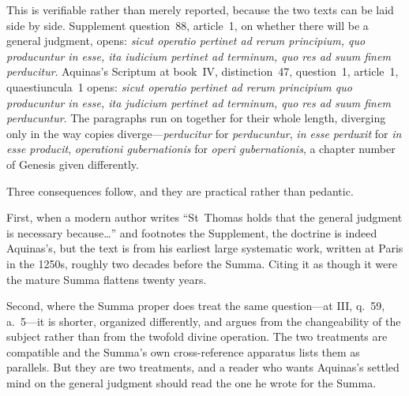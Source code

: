 This is verifiable rather than merely reported, because the two texts can be laid side by side. Supplement question~88, article~1, on whether there will be a general judgment, opens: \emph{sicut operatio pertinet ad rerum principium, quo producuntur in esse, ita iudicium pertinet ad terminum, quo res ad suum finem perducitur}. Aquinas's Scriptum at book~IV, distinction~47, question~1, article~1, quaestiuncula~1 opens: \emph{sicut operatio pertinet ad rerum principium quo producuntur in esse, ita judicium pertinet ad terminum, quo res ad suum finem perducuntur}. The paragraphs run on together for their whole length, diverging only in the way copies diverge---\emph{perducitur} for \emph{perducuntur}, \emph{in esse perduxit} for \emph{in esse producit}, \emph{operationi gubernationis} for \emph{operi gubernationis}, a chapter number of Genesis given differently.

Three consequences follow, and they are practical rather than pedantic.

First, when a modern author writes ``St~Thomas holds that the general judgment is necessary because\ldots'' and footnotes the Supplement, the doctrine is indeed Aquinas's, but the text is from his earliest large systematic work, written at Paris in the 1250s, roughly two decades before the Summa. Citing it as though it were the mature Summa flattens twenty years.

Second, where the Summa proper does treat the same question---at III, q.~59, a.~5---it is shorter, organized differently, and argues from the changeability of the subject rather than from the twofold divine operation. The two treatments are compatible and the Summa's own cross-reference apparatus lists them as parallels. But they are two treatments, and a reader who wants Aquinas's settled mind on the general judgment should read the one he wrote for the Summa.

